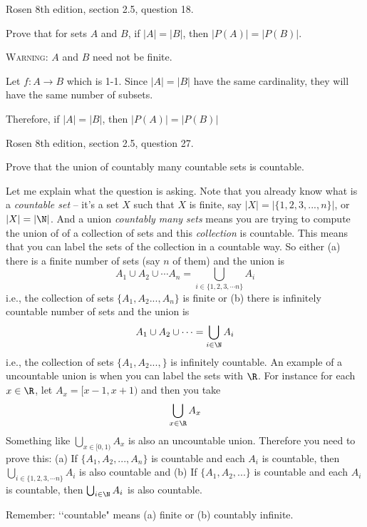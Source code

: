 

\newpage
\nextq Rosen 8th edition, section 2.5, question 18.

Prove that for sets $A$ and $B$, if $|A| = |B|$, then $|P(A)| = |P(B)|$.

\textsc{Warning:} $A$ and $B$ need not be finite.

\SOLUTION

Let $f: A \rightarrow B$ which is 1-1. Since $|A| = |B|$ have the same cardinality, they will have the same number of subsets.

Therefore, if $|A| = |B|$, then $|P(A)| = |P(B)|$



\newpage
\nextq Rosen 8th edition, section 2.5, question 27.

Prove that the union of countably many countable sets is countable.
      
Let me explain what the question is asking.
Note that you already know what
is a \textit{countable set} -- it's a set $X$ such that $X$ is finite, say
$|X| = |\{1, 2, 3, ..., n\}|$, or $|X| = |\N|$.
And a union \textit{countably many sets} means you are trying to
compute the union of of a collection of sets and this \textit{collection} is
countable.
This means that you can label the sets of the collection in a countable way.
So either
(a) there is a finite number of sets (say $n$ of them) and the union is
\[
A_1 \cup A_2 \cup \cdots A_n = \bigcup_{i \in \{1, 2, 3, \cdots n\}} A_i
\]
i.e., the collection of sets $\{A_1, A_2 ..., A_n\}$ is finite
or
(b) there is infinitely countable number of sets and the union is
\[
A_1 \cup A_2 \cup \cdots = \bigcup_{i \in \N} A_i
\]
i.e., the collection of sets $\{A_1, A_2 ..., \}$ is infinitely countable.
An example of a uncountable union is when you can label the sets with $\R$.
For instance for each $x \in \R$, let $A_x = [x-1, x+1)$ and then you take
\[
\bigcup_{x \in \R} A_x
\]
Something like $\bigcup_{x \in [0,1)} A_x$ is also an uncountable union.
Therefore you need to prove this:
(a) If $\{A_1, A_2, ..., A_n\}$ is countable and each $A_i$ is countable, then
$\bigcup_{i \in \{1, 2, 3, \cdots n\}} A_i$ is also countable and
(b) If $\{A_1, A_2, ...\}$ is countable and each $A_i$ is countable, then
$\bigcup_{i \in \N} A_i$ is also countable.

Remember: \lq\lq countable" means (a) finite or (b) countably infinite.

